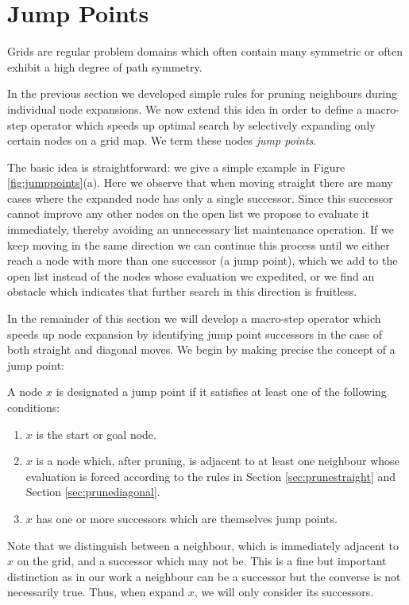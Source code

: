 \section{Jump Points}
Grids are regular problem domains which often contain many symmetric or 
often exhibit a high degree of 
path symmetry. 


In the previous section we developed simple rules for pruning neighbours during 
individual node expansions. We now extend this idea in order to define a 
macro-step operator which speeds up optimal search by selectively expanding
only certain nodes on a grid map. We term these nodes \emph{jump points}.
\par
The basic idea is straightforward: we give a simple example in Figure 
\ref{fig:jumppoints}(a).
Here we observe that when moving straight there are many cases where
the expanded node has only a single successor.
Since this successor cannot improve any other nodes on the open list we 
propose to evaluate it immediately, thereby avoiding an unnecessary list
maintenance operation. 
If we keep moving in the same direction we can continue this process until we 
either reach a node with more than one successor (a jump point), which we add to the open list instead of the nodes whose evaluation we expedited, or we find an 
obstacle which indicates that further search in this direction is fruitless.
\par
In the remainder of this section we will develop a macro-step operator which 
speeds up node expansion by identifying jump point successors in the case of
both straight and diagonal moves. We begin by making precise the concept of a
jump point:

\begin{definition}
\label{def:jump}
A node $x$ is designated a jump point if it satisfies at least one of the following
conditions:
\begin{enumerate}
\item{$x$ is the start or goal node.}
\item{$x$ is a node which, after pruning, is adjacent to at least one neighbour
whose evaluation is forced according to the rules in Section
\ref{sec:prunestraight} and Section \ref{sec:prunediagonal}.}
\item{$x$ has one or more successors which are themselves jump points.}
\end{enumerate}
\end{definition}

Note that we distinguish between a neighbour, which is immediately adjacent to
$x$ on the grid, and a successor which may not be. 
This is a fine but important distinction as in our work a neighbour can be a 
successor but the converse is not necessarily true.
Thus, when expand $x$, we will only consider its successors.


